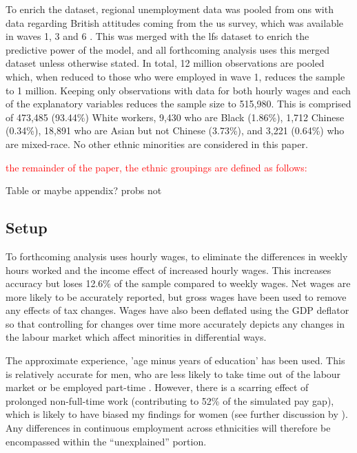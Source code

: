 \documentclass[class=article, crop=false]{standalone}
\begin{document}
To enrich the dataset, regional unemployment data was pooled from \acrlong{ons} \citep{ONSf} with data regarding British attitudes coming from the \acrfull{us} survey, which was available in waves 1, 3 and 6 \citep{US}. This was merged with the \acrshort{lfs} dataset to enrich the predictive power of the model, and all forthcoming analysis uses this merged dataset unless otherwise stated. In total, 12 million observations are pooled which, when reduced to those who were employed in wave 1, reduces the sample to 1 million. Keeping only observations with data for both hourly wages and each of the explanatory variables reduces the sample size to 515,980. This is comprised of 473,485 (93.44\%) White workers, 9,430 who are Black (1.86\%), 1,712 Chinese (0.34\%), 18,891 who are  Asian but not Chinese (3.73\%), and 3,221 (0.64\%) who are mixed-race. No other ethnic minorities are considered in this paper.

\textcolor{red}{the remainder of the paper, the ethnic groupings are defined as follows:} 

Table or maybe appendix? probs not


\subsection{Setup}
\label{sec:Setup}
To forthcoming analysis uses hourly wages, to eliminate the differences in weekly hours worked and the income effect of increased hourly wages. This increases accuracy but loses 12.6\% of the sample compared to weekly wages. Net wages are more likely to be accurately reported, but gross wages have been used to remove any effects of tax changes. Wages have also been deflated using the GDP deflator \citep{ONSh} so that controlling for changes over time more accurately depicts any changes in the labour market which affect minorities in differential ways. 

The approximate experience, 'age minus years of education' has been used. This is relatively accurate for men, who are less likely to take time out of the labour market or be employed part-time \citep{Olsen}. However, there is a scarring effect of prolonged non-full-time work (contributing to 52\% of the simulated pay gap), which is likely to have biased my findings for women (see further discussion by \citet{Walby}). Any differences in continuous employment across ethnicities will therefore be encompassed within the \enquote{unexplained} portion.
\end{document}

